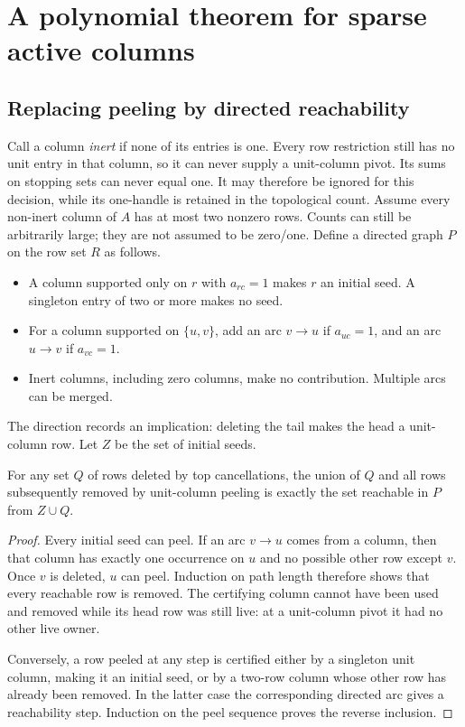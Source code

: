 \section{A polynomial theorem for sparse active columns}
\label{sec:sparse}

\subsection{Replacing peeling by directed reachability}
Call a column \emph{inert} if none of its entries is one.  Every row
restriction still has no unit entry in that column, so it can never supply
a unit-column pivot.  Its sums on stopping sets can never equal one.
It may therefore be ignored for this decision, while its one-handle is
retained in the topological count.  Assume every non-inert column of $A$
has at most two nonzero rows.  Counts can still be arbitrarily large;
they are not assumed to be zero/one.  Define a
directed graph $P$ on the row set $R$ as follows.
\begin{itemize}
\item A column supported only on $r$ with $a_{rc}=1$ makes $r$ an initial
  seed.  A singleton entry of two or more makes no seed.
\item For a column supported on $\{u,v\}$, add an arc $v\to u$ if
  $a_{uc}=1$, and an arc $u\to v$ if $a_{vc}=1$.
\item Inert columns, including zero columns, make no contribution.
  Multiple arcs can be merged.
\end{itemize}
The direction records an implication: deleting the tail makes the head a
unit-column row.  Let $Z$ be the set of initial seeds.

\begin{lemma}\label{lem:reachability}
For any set $Q$ of rows deleted by top cancellations, the union of $Q$
and all rows subsequently removed by unit-column peeling is exactly the
set reachable in $P$ from $Z\cup Q$.
\end{lemma}
\begin{proof}
Every initial seed can peel.  If an arc $v\to u$ comes from a column,
then that column has exactly one occurrence on $u$ and no possible other
row except $v$.  Once $v$ is deleted, $u$ can peel.  Induction on path
length therefore shows that every reachable row is removed.  The
certifying column cannot have been used and removed while its head row
was still live: at a unit-column pivot it had no other live owner.

Conversely, a row peeled at any step is certified either by a singleton
unit column, making it an initial seed, or by a two-row column whose other
row has already been removed.  In the latter case the corresponding
directed arc gives a reachability step.  Induction on the peel sequence
proves the reverse inclusion.
\end{proof}

